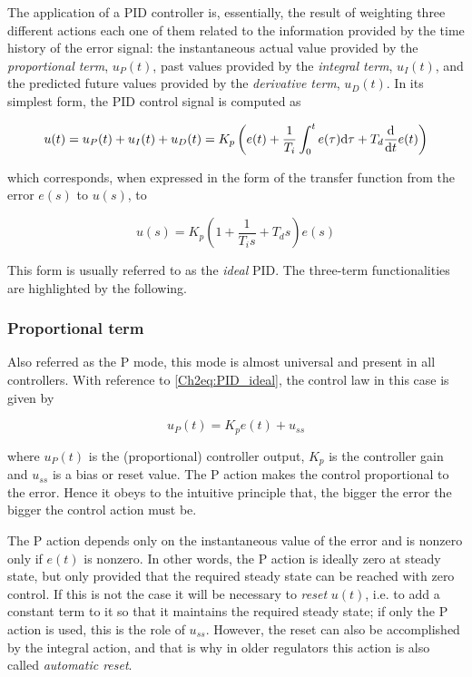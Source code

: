 The application of a PID controller is, essentially, the result of weighting three different actions each one of them related to the information provided by the time history of the error signal: the instantaneous actual value provided by the  \emph{proportional term}, $u_P(t)$, past values provided by the \emph{integral term}, $u_I(t)$, and the predicted future values provided by the \emph{derivative term}, $u_D(t)$.  In its simplest form, the PID control signal is computed as

\begin{equation}
u(t)=u_P(t)+u_I(t)+u_D(t)= K_p \left ( e(t)+\frac{1}{T_i}\int_0^t e(\tau)\mathrm{d} \tau+T_d\frac{\mathrm{d}}{\mathrm{d} t}e(t) \right )
\end{equation}

\noindent which corresponds, when expressed in the form of the transfer function from the error $e(s)$ to $u(s)$, to

\begin{equation}
u(s)=K_p \left ( 1+\frac{1}{T_is}+{T_ds} \right )  e(s)
\label{Ch2eq:PID_ideal}
\end{equation}

This form is usually referred to as the \emph{ideal} PID. The three-term functionalities are highlighted by the following.

\subsubsection*{Proportional term}

Also referred as the P mode, this mode is almost universal and present in all controllers. With reference to \eqref{Ch2eq:PID_ideal}, the control law in this case is given by

\[u_P (t) = K_pe(t) + u_{ss}\]

\noindent where $u_P(t)$ is the (proportional) controller output, $K_p$ is the controller gain and $u_{ss}$ is a bias or reset value. The P action makes the control proportional to the error. Hence it obeys to the intuitive principle that, the bigger the error the bigger the control action must be.

The P action depends only on the instantaneous value of the error and is nonzero only if $e(t)$ is nonzero. In other words, the P action is ideally zero at steady state, but only provided that the required steady state can be reached with zero control. If this is not the case it will be necessary to \emph{reset} $u(t)$, i.e. to add a constant term to it so that it maintains the required steady state; if only the P action is used, this is the role of $u_{ss}$. However, the reset can also be accomplished by the integral action, and that is why  in older regulators this action is also called \emph{automatic reset}. 


